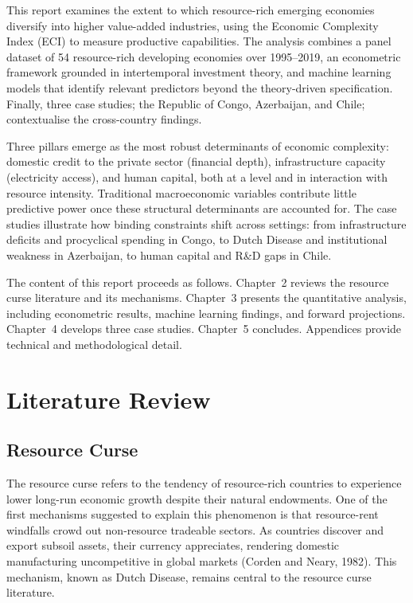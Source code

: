 \documentclass[12pt,a4paper]{report}
\begin{document}
This report examines the extent to which resource-rich emerging economies diversify into higher value-added industries, using the Economic Complexity Index (ECI) to measure productive capabilities. The analysis combines a panel dataset of 54 resource-rich developing economies over 1995--2019, an econometric framework grounded in intertemporal investment theory, and machine learning models that identify relevant predictors beyond the theory-driven specification. Finally, three case studies; the Republic of Congo, Azerbaijan, and Chile; contextualise the cross-country findings.

Three pillars emerge as the most robust determinants of economic complexity: domestic credit to the private sector (financial depth), infrastructure capacity (electricity access), and human capital, both at a level and in interaction with resource intensity. Traditional macroeconomic variables contribute little predictive power once these structural determinants are accounted for. The case studies illustrate how binding constraints shift across settings: from infrastructure deficits and procyclical spending in Congo, to Dutch Disease and institutional weakness in Azerbaijan, to human capital and R\&D gaps in Chile.

The content of this report proceeds as follows. Chapter~2 reviews the resource curse literature and its mechanisms. Chapter~3 presents the quantitative analysis, including econometric results, machine learning findings, and forward projections. Chapter~4 develops three case studies. Chapter~5 concludes. Appendices provide technical and methodological detail.


\chapter{Literature Review}

\section{Resource Curse}

The resource curse refers to the tendency of resource-rich countries to experience lower long-run economic growth despite their natural endowments. One of the first mechanisms suggested to explain this phenomenon is that resource-rent windfalls crowd out non-resource tradeable sectors. As countries discover and export subsoil assets, their currency appreciates, rendering domestic manufacturing uncompetitive in global markets (Corden and Neary, 1982). This mechanism, known as Dutch Disease, remains central to the resource curse literature.
\end{document}
